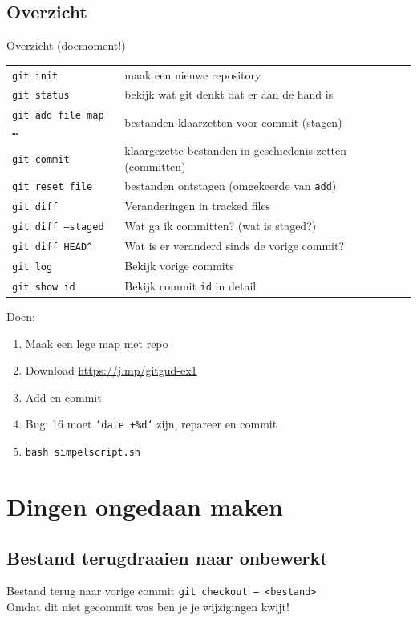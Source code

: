 \subsection{Overzicht}
\begin{frame}{Overzicht (doemoment!)}
	{ \footnotesize
	\begin{tabular}{ll}
		\texttt{git init}					& maak een nieuwe repository \\
		\texttt{git status} 				& bekijk wat git denkt dat er aan de hand is \\
		\texttt{git add file map \ldots}	& bestanden klaarzetten voor commit (stagen)	\\
		\texttt{git commit} 				& klaargezette bestanden in geschiedenis zetten (committen)\\
		\texttt{git reset file}		    	& bestanden ontstagen (omgekeerde van \texttt{add})	\\
		\hline
		\texttt{git diff}					& Veranderingen in tracked files					\\
		\texttt{git diff --staged}			& Wat ga ik committen? (wat is staged?)				\\
		\texttt{git diff HEAD\^}			& Wat is er veranderd sinds de vorige commit?		\\
		\hline
		\texttt{git log}					& Bekijk vorige commits								\\
		\texttt{git show id}				& Bekijk commit \texttt{id} in detail
	\end{tabular}
	}
	Doen:
	\begin{enumerate}
		\item Maak een lege map met repo
		\item Download \url{https://j.mp/gitgud-ex1}
		\item Add en commit
		\item Bug: 16 moet \texttt{`date +\%d`} zijn, repareer en commit
		\item \texttt{bash simpelscript.sh}
	\end{enumerate}
\end{frame}

\section[Ongedaan]{Dingen ongedaan maken}

\subsection{Bestand terugdraaien naar onbewerkt}
\begin{frame}{Bestand terug naar vorige commit}
	\texttt{git checkout -- <bestand>} \\
	\alert{Omdat dit niet gecommit was ben je je wijzigingen kwijt!}
\end{frame}

